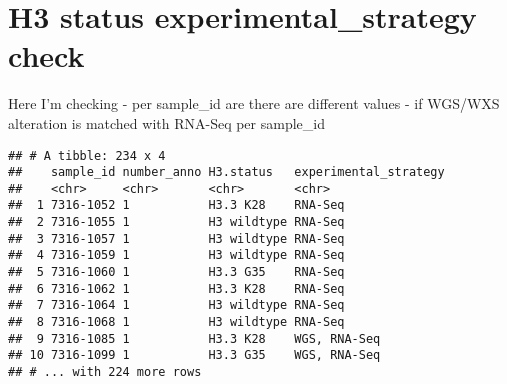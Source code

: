 \documentclass[]{article}
\newenvironment{Shaded}{\begin{snugshade}}{\end{snugshade}}
\newcommand{\KeywordTok}[1]{\textcolor[rgb]{0.13,0.29,0.53}{\textbf{#1}}}
\newcommand{\DataTypeTok}[1]{\textcolor[rgb]{0.13,0.29,0.53}{#1}}
\newcommand{\StringTok}[1]{\textcolor[rgb]{0.31,0.60,0.02}{#1}}
\newcommand{\OperatorTok}[1]{\textcolor[rgb]{0.81,0.36,0.00}{\textbf{#1}}}
\newcommand{\NormalTok}[1]{#1}
\begin{document}
\section{H3 status experimental\_strategy
check}\label{h3-status-experimental_strategy-check}

Here I'm checking - per sample\_id are there are different values - if
WGS/WXS alteration is matched with RNA-Seq per sample\_id

\begin{Shaded}
\end{Shaded}

\begin{verbatim}
## # A tibble: 234 x 4
##    sample_id number_anno H3.status   experimental_strategy
##    <chr>     <chr>       <chr>       <chr>                
##  1 7316-1052 1           H3.3 K28    RNA-Seq              
##  2 7316-1055 1           H3 wildtype RNA-Seq              
##  3 7316-1057 1           H3 wildtype RNA-Seq              
##  4 7316-1059 1           H3 wildtype RNA-Seq              
##  5 7316-1060 1           H3.3 G35    RNA-Seq              
##  6 7316-1062 1           H3.3 K28    RNA-Seq              
##  7 7316-1064 1           H3 wildtype RNA-Seq              
##  8 7316-1068 1           H3 wildtype RNA-Seq              
##  9 7316-1085 1           H3.3 K28    WGS, RNA-Seq         
## 10 7316-1099 1           H3.3 G35    WGS, RNA-Seq         
## # ... with 224 more rows
\end{verbatim}
\end{document}
